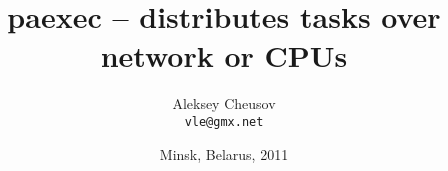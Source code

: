 \documentclass[hyperref={colorlinks=true}]{beamer}
\title{paexec -- distributes tasks over network or CPUs}
\author{Aleksey Cheusov \\ \texttt{vle@gmx.net}}
\date{Minsk, Belarus, 2011}
\begin{document}

\newenvironment{CodeSmall}[1]%
               {\Verbatim[label=\bf{#1},frame=single,%
                   fontsize=\footnotesize,%
                   commandchars=\\\{\}]}%
               {\endVerbatim}
\newenvironment{CodeSmallNoLabel}%
               {\Verbatim[frame=single,%
                   fontsize=\footnotesize,%
                   commandchars=\\\{\}]}%
               {\endVerbatim}

\newenvironment{Code}[1]%
              {\Verbatim[label=\bf{#1},frame=single,%
                  fontsize=\small,%
                  commandchars=\\\{\}]}%
              {\endVerbatim}
\newenvironment{CodeNoLabel}%
               {\Verbatim[frame=single,%
                   fontsize=\small,%
                   commandchars=\\\{\}]}%
               {\endVerbatim}

\newenvironment{CodeLarge}[1]%
               {\Verbatim[label=\bf{#1},frame=single,%
                   fontsize=\large,%
                   commandchars=\\\{\}]}%
               {\endVerbatim}
\newenvironment{CodeLargeNoLabel}%
               {\Verbatim[frame=single,%
                   fontsize=\large,%
                   commandchars=\\\{\}]}%
               {\endVerbatim}

\newcommand{\prompt}[1]{{\bf{#1}}}
\newcommand{\h}[1]{{\bf{#1}}}
\newcommand{\URL}[1]{\textbf{#1}}
\newcommand{\AutohellFile}[1]{\textcolor{red}{#1}}
\newcommand{\MKCfile}[1]{\textcolor{green}{#1}}
\newcommand{\ModuleName}[1]{\textbf{#1}\textnormal{}}
\newcommand{\ProgName}[1]{\textbf{#1}\textnormal{}}
\newcommand{\ProjectName}[1]{\textbf{#1}\textnormal{}}
\newcommand{\PackageName}[1]{\textbf{#1}\textnormal{}}
\newcommand{\MKC}[1]{\large\textsf{#1}\textnormal{}\normalsize}

\end{document}
